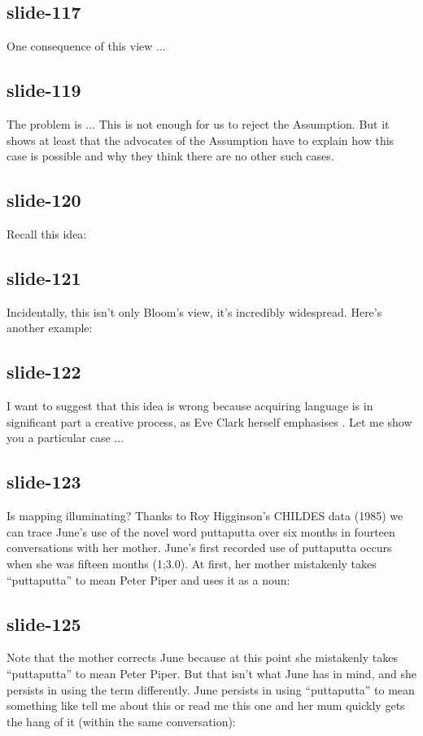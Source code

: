 \documentclass[12pt,\papersize]{extarticle}
\begin{document}
 
\subsection{slide-117}
One consequence of this view ...
 
 
\subsection{slide-119}
The problem is ...
This is not enough for us to reject the Assumption. But it shows at least that the advocates of the Assumption have to explain how this case is possible and why they think there are no other such cases.
 
 
\subsection{slide-120}
Recall this idea:
 
 
\subsection{slide-121}
Incidentally, this isn't only Bloom's view, it's incredibly widespread.
Here's another example:
 
 
\subsection{slide-122}
I want to suggest that this idea is wrong because acquiring language is in significant part a creative process, as Eve Clark herself emphasises \citep[in][]{Clark:1993bv} .
Let me show you a particular case ...
 
 
\subsection{slide-123}
Is mapping illuminating?
Thanks to Roy Higginson's CHILDES data (1985) we can trace June's use of the novel word puttaputta over six months in fourteen conversations with her mother.
June's first recorded use of puttaputta occurs when she was fifteen months (1;3.0).
At first, her mother mistakenly takes “puttaputta” to mean Peter Piper and uses it as a noun:
 
 
\subsection{slide-125}
Note that the mother corrects June because at this point she mistakenly takes “puttaputta” to mean Peter Piper.
But that isn't what June has in mind, and she persists in using the term differently.
June persists in using “puttaputta” to mean something like tell me about this or read me this one and her mum quickly gets the hang of it (within the same conversation):
 
\end{document}
